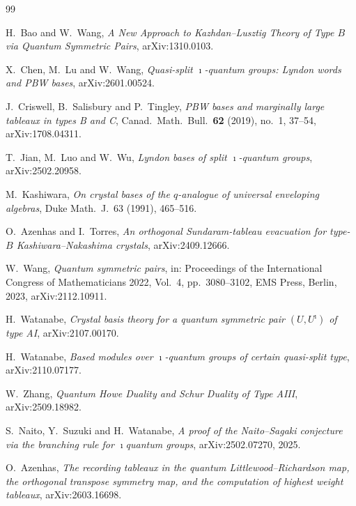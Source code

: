 \documentclass[11pt]{article}
\theoremstyle{definition}
\theoremstyle{remark}
\begin{document}
\begin{thebibliography}{99}

H.~Bao and W.~Wang,
\emph{A New Approach to Kazhdan--Lusztig Theory of Type $B$ via Quantum Symmetric Pairs},
arXiv:1310.0103.

X.~Chen, M.~Lu and W.~Wang,
\emph{Quasi-split $\imath$-quantum groups: Lyndon words and PBW bases},
arXiv:2601.00524.

J.~Criswell, B.~Salisbury and P.~Tingley,
\emph{PBW bases and marginally large tableaux in types B and C},
Canad.~Math.~Bull.~\textbf{62} (2019), no.~1, 37--54, arXiv:1708.04311.

T.~Jian, M.~Luo and W.~Wu,
\emph{Lyndon bases of split $\imath$-quantum groups},
arXiv:2502.20958.

M.~Kashiwara,
\emph{On crystal bases of the $q$-analogue of universal enveloping algebras},
Duke Math.~J.~63 (1991), 465--516.

O.~Azenhas and I.~Torres,
\emph{An orthogonal Sundaram-tableau evacuation for type-$B$ Kashiwara--Nakashima crystals},
arXiv:2409.12666.

W.~Wang,
\emph{Quantum symmetric pairs}, in:
Proceedings of the International Congress of Mathematicians 2022, Vol.~4,
pp.~3080--3102, EMS Press, Berlin, 2023, arXiv:2112.10911.

H.~Watanabe,
\emph{Crystal basis theory for a quantum symmetric pair $(U, U^\imath)$ of type AI},
arXiv:2107.00170.

H.~Watanabe,
\emph{Based modules over $\imath$-quantum groups of certain quasi-split type},
arXiv:2110.07177.

W.~Zhang,
\emph{Quantum Howe Duality and Schur Duality of Type AIII},
arXiv:2509.18982.

S.~Naito, Y.~Suzuki and H.~Watanabe,
\emph{A proof of the Naito--Sagaki conjecture via the branching rule for $\imath$quantum groups},
arXiv:2502.07270, 2025.

O.~Azenhas,
\emph{The recording tableaux in the quantum Littlewood--Richardson map, the orthogonal
transpose symmetry map, and the computation of highest weight tableaux},
arXiv:2603.16698.


\end{thebibliography}
\end{document}
